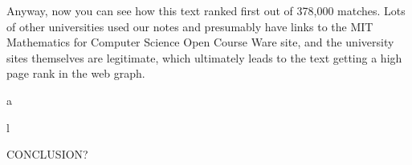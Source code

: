 Anyway, now you can see how this text ranked first out of 378,000
matches.  Lots of other universities used our notes and presumably
have links to the MIT Mathematics for Computer Science Open Course
Ware site, and the university sites themselves are legitimate, which
ultimately leads to the text getting a high page rank in the web
graph.

\begin{problems}
\practiceproblems
{}

\classproblems
{}

a\homeworkproblems
{}

\examproblems
{}
l
\end{problems}
\begin{editingnotes}
CONCLUSION?
\end{editingnotes}
\endinput
